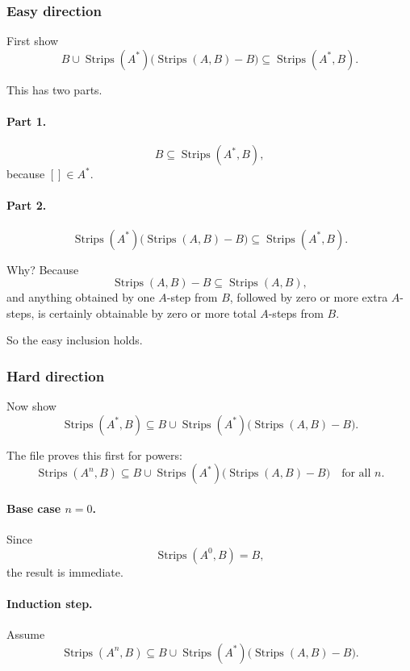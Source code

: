 \documentclass[11pt]{article}
\begin{document}
\subsubsection*{Easy direction}

First show
\[
B \cup \operatorname{Strips}(A^*)\bigl(\operatorname{Strips}(A,B)-B\bigr)
\subseteq
\operatorname{Strips}(A^*,B).
\]

This has two parts.

\paragraph{Part 1.}
\[
B\subseteq \operatorname{Strips}(A^*,B),
\]
because \([]\in A^*\).

\paragraph{Part 2.}
\[
\operatorname{Strips}(A^*)\bigl(\operatorname{Strips}(A,B)-B\bigr)
\subseteq
\operatorname{Strips}(A^*,B).
\]

Why? Because
\[
\operatorname{Strips}(A,B)-B \subseteq \operatorname{Strips}(A,B),
\]
and anything obtained by one \(A\)-step from \(B\), followed by zero or more extra \(A\)-steps, is certainly obtainable by zero or more total \(A\)-steps from \(B\).

So the easy inclusion holds.

\subsubsection*{Hard direction}

Now show
\[
\operatorname{Strips}(A^*,B)
\subseteq
B \cup \operatorname{Strips}(A^*)\bigl(\operatorname{Strips}(A,B)-B\bigr).
\]

The file proves this first for powers:
\[
\operatorname{Strips}(A^n,B)
\subseteq
B \cup \operatorname{Strips}(A^*)\bigl(\operatorname{Strips}(A,B)-B\bigr)
\quad\text{for all }n.
\]

\paragraph{Base case \(n=0\).}
Since
\[
\operatorname{Strips}(A^0,B)=B,
\]
the result is immediate.

\paragraph{Induction step.}
Assume
\[
\operatorname{Strips}(A^n,B)
\subseteq
B \cup \operatorname{Strips}(A^*)\bigl(\operatorname{Strips}(A,B)-B\bigr).
\]
\end{document}
